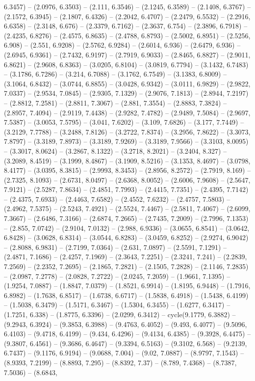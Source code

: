 6.3457) -- (2.0976, 6.3503) -- (2.111, 6.3546) -- (2.1245, 6.3589) -- (2.1408, 6.3767) -- (2.1572, 6.3945) -- (2.1807, 6.4326) -- (2.2042, 6.4707) -- (2.2479, 6.5532) -- (2.2916, 6.6358) -- (2.3148, 6.676) -- (2.3379, 6.7162) -- (2.3637, 6.754) -- (2.3896, 6.7918) -- (2.4235, 6.8276) -- (2.4575, 6.8635) -- (2.4788, 6.8793) -- (2.5002, 6.8951) -- (2.5256, 6.908) -- (2.551, 6.9208) -- (2.5762, 6.9284) -- (2.6014, 6.936) -- (2.6479, 6.936) -- (2.6945, 6.9361) -- (2.7432, 6.9197) -- (2.7919, 6.9033) -- (2.8465, 6.8827) -- (2.9011, 6.8621) -- (2.9608, 6.8363) -- (3.0205, 6.8104) -- (3.0819, 6.7794) -- (3.1432, 6.7483) -- (3.1786, 6.7286) -- (3.214, 6.7088) -- (3.1762, 6.7549) -- (3.1383, 6.8009) -- (3.1064, 6.8432) -- (3.0744, 6.8855) -- (3.0428, 6.9342) -- (3.0111, 6.9829) -- (2.9822, 7.0337) -- (2.9534, 7.0845) -- (2.9305, 7.1329) -- (2.9076, 7.1813) -- (2.8944, 7.2197) -- (2.8812, 7.2581) -- (2.8811, 7.3067) -- (2.881, 7.3554) -- (2.8883, 7.3824) -- (2.8957, 7.4094) -- (2.9119, 7.4438) -- (2.9282, 7.4782) -- (2.9489, 7.5084) -- (2.9697, 7.5387) -- (3.0053, 7.5795) -- (3.041, 7.6202) -- (3.109, 7.6826) -- (3.177, 7.7449) -- (3.2129, 7.7788) -- (3.2488, 7.8126) -- (3.2722, 7.8374) -- (3.2956, 7.8622) -- (3.3073, 7.8797) -- (3.3189, 7.8973) -- (3.3189, 7.9269) -- (3.3189, 7.9566) -- (3.3103, 8.0095) -- (3.3017, 8.0624) -- (3.2867, 8.1322) -- (3.2718, 8.2021) -- (3.2404, 8.327) -- (3.2089, 8.4519) -- (3.1999, 8.4867) -- (3.1909, 8.5216) -- (3.1353, 8.4697) -- (3.0798, 8.4177) -- (3.0395, 8.3815) -- (2.9993, 8.3453) -- (2.8956, 8.2572) -- (2.7919, 8.169) -- (2.7325, 8.1093) -- (2.6731, 8.0497) -- (2.6368, 8.0052) -- (2.6006, 7.9608) -- (2.5647, 7.9121) -- (2.5287, 7.8634) -- (2.4851, 7.7993) -- (2.4415, 7.7351) -- (2.4395, 7.7142) -- (2.4375, 7.6933) -- (2.4463, 7.6582) -- (2.4552, 7.6232) -- (2.4757, 7.5803) -- (2.4962, 7.5375) -- (2.5243, 7.4921) -- (2.5524, 7.4467) -- (2.5811, 7.4067) -- (2.6099, 7.3667) -- (2.6486, 7.3166) -- (2.6874, 7.2665) -- (2.7435, 7.2009) -- (2.7996, 7.1353) -- (2.855, 7.0742) -- (2.9104, 7.0132) -- (2.988, 6.9336) -- (3.0655, 6.8541) -- (3.0642, 6.8428) -- (3.0628, 6.8314) -- (3.0544, 6.8283) -- (3.0459, 6.8252) -- (2.9274, 6.9042) -- (2.8088, 6.9831) -- (2.7199, 7.0364) -- (2.631, 7.0897) -- (2.5591, 7.1291) -- (2.4871, 7.1686) -- (2.4257, 7.1969) -- (2.3643, 7.2251) -- (2.3241, 7.241) -- (2.2839, 7.2569) -- (2.2352, 7.2695) -- (2.1865, 7.2821) -- (2.1505, 7.2828) -- (2.1146, 7.2835) -- (2.0987, 7.2778) -- (2.0828, 7.2722) -- (2.0245, 7.2059) -- (1.9661, 7.1395) -- (1.9254, 7.0887) -- (1.8847, 7.0379) -- (1.8521, 6.9914) -- (1.8195, 6.9448) -- (1.7916, 6.8982) -- (1.7638, 6.8517) -- (1.6738, 6.6717) -- (1.5838, 6.4918) -- (1.5438, 6.4199) -- (1.5038, 6.3479) -- (1.5171, 6.3467) -- (1.5304, 6.3455) -- (1.6277, 6.3417) -- (1.7251, 6.338) -- (1.8775, 6.3396) -- (2.0299, 6.3412) -- cycle(9.1779, 6.3882) -- (9.2943, 6.3924) -- (9.3853, 6.3988) -- (9.4763, 6.4052) -- (9.493, 6.4077) -- (9.5096, 6.4103) -- (9.4718, 6.4199) -- (9.434, 6.4296) -- (9.4134, 6.4385) -- (9.3928, 6.4475) -- (9.3807, 6.4561) -- (9.3686, 6.4647) -- (9.3394, 6.5163) -- (9.3102, 6.568) -- (9.2139, 6.7437) -- (9.1176, 6.9194) -- (9.0688, 7.004) -- (9.02, 7.0887) -- (8.9797, 7.1543) -- (8.9393, 7.2199) -- (8.8893, 7.295) -- (8.8392, 7.37) -- (8.789, 7.4368) -- (8.7387, 7.5036) -- (8.6843, 